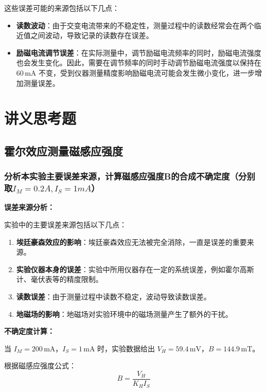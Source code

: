 \documentclass[UTF-8,twoside,cs4size]{ctexart}
\begin{document}
这些误差可能的来源包括以下几点：
\begin{itemize}
    \item \textbf{读数波动}：由于交变电流带来的不稳定性，测量过程中的读数经常会在两个临近值之间波动，导致记录的读数存在误差。
    \item \textbf{励磁电流调节误差}：在实际测量中，调节励磁电流频率的同时，励磁电流强度也会发生变化。因此，需要在调节频率的同时手动调节励磁电流强度以保持在 $60 \, \mathrm{mA}$ 不变，受到仪器测量精度影响励磁电流可能会发生微小变化，进一步增加测量误差。
\end{itemize}

\section{讲义思考题}
\subsection{霍尔效应测量磁感应强度}
        \subsubsection{分析本实验主要误差来源，计算磁感应强度B的合成不确定度（分别取$I_M=0.2A,I_S=1mA$）}
        \textbf{误差来源分析：} \par
实验中的主要误差来源包括以下几点：
\begin{enumerate}
    \item \textbf{埃廷豪森效应的影响}：埃廷豪森效应无法被完全消除，一直是误差的重要来源。\par
    \item \textbf{实验仪器本身的误差}：实验中所用仪器存在一定的系统误差，例如霍尔高斯计、毫伏表等的精度限制。\par
    \item \textbf{读数误差}：由于测量过程中读数不稳定，波动导致读数误差。\par
    \item \textbf{地磁场的影响}：地磁场对实验环境中的磁场测量产生了额外的干扰。\par
\end{enumerate}

\textbf{不确定度计算：} \par
当 $I_M = 200 \, \mathrm{mA}$，$I_S = 1 \, \mathrm{mA}$ 时，实验数据给出 $V_H = 59.4 \, \mathrm{mV}$，$B = 144.9 \, \mathrm{mT}$。\par

根据磁感应强度公式：
\[
B = \frac{V_H}{{K_H I_S}}
\]
\end{document}
